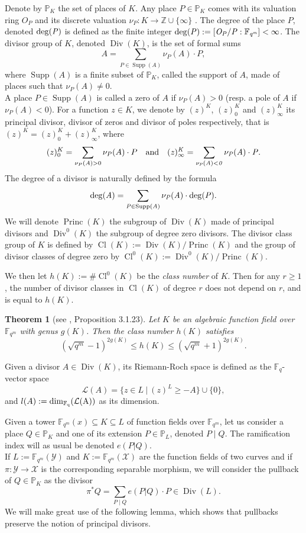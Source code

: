 \documentclass[10pt]{article}
\newtheorem{thm}{Theorem}
\newcommand{\s}{\vspace{0.3cm}}
\newcommand{\cd}{\cdot}
\newcommand{\Z}{\mathbb{Z}}
\newcommand{\PP}{\mathbb{P}}
\newcommand{\fqm}{\mathbb{F}_{q^m}}
\newcommand{\fq}{\mathbb{F}_q}
\newcommand{\su}{\subseteq}
\newcommand{\X}{\mathcal{X}}
\newcommand{\Y}{\mathcal{Y}}
\newcommand{\Div}{\operatorname{Div}}
\newcommand{\Princ}{\operatorname{Princ}}
\newcommand{\Cl}{\operatorname{Cl}}
\newcommand{\Supp}{\operatorname{Supp}}
\begin{document}
Denote by $\PP_K$ the set of places of $K$. Any place $P \in \PP_K$ comes with its valuation ring $O_P$ and its discrete valuation $\nu_P : K \rightarrow \Z \cup \{\infty\}$ . The degree of the place $P$, denoted $\rm{deg}(\it P)$ is defined as the finite integer $\rm{deg}( \it P) := \it [O_P/P:\fqm] < \infty$.
The divisor group of $K$, denoted $\Div(K)$, is the set of formal sums 
\[A = \sum\limits_{P \in \Supp(A)} \nu_P(A) \cd P,\]
where $\Supp(A)$ is a finite subset of $\PP_K$, called the support of $A$, made of places such that $\nu_{P}(A) \neq 0$. \\ A place  $P \in \Supp(A)$ is called a zero of $A$ if $\nu_P(A) >0$ (resp. a pole of $A$ if $\nu_P(A) < 0$). For a function $z \in K$, we denote by $(z)^K$, $(z)^K_0$ and $(z)^K_{\infty}$ its principal divisor, divisor of zeros and divisor of poles respectively, that is $(z)^K = (z)^K_0 + (z)^K_{\infty}$, where 
\[(z)^K_0 = \sum\limits_{\nu_P(A) > 0}\nu_P(A) \cd P \quad \rm{and} \it \quad (z)^K_{\infty} = \sum\limits_{\nu_P(A) < 0}\nu_P(A) \cd P.\]
The degree of a divisor is naturally defined by the formula
\[\rm{deg} (\it A) = \sum\limits_{P \in \Supp(A)} \nu_P(A) \cd \rm{deg}(\it P).\]
\s
We will denote $\Princ(K)$ the subgroup of $\Div(K)$ made of principal divisors and $\Div^0(K)$ the subgroup of degree zero divisors. The divisor class group of $K$ is defined by $\Cl(K):=\Div(K)/\Princ(K)$ and the group of divisor classes of degree zero by $\Cl^0(K):=\Div^0(K)/\Princ(K)$. 

We then let $h(K) := \# \Cl^0(K)$ be the \emph{class number} of $K$. Then for any $r \geq 1$, the number of divisor classes in $\Cl(K)$ of degree $r$ does not depend on $r$, and is equal to $h(K)$.

\s

\begin{thm}[see \cite{Tsf}, Proposition 3.1.23]\label{esti h(X)}
Let $K$ be an algebraic function field over $\fqm$ with genus $g(K)$. Then the class number $h(K)$ satisfies
\[ (\sqrt{q^m}-1)^{2g(K)} \leq h(K) \leq (\sqrt{q^m}+1)^{2g(K)}.\]
\end{thm}
\s

Given a divisor $A \in \Div(K)$, its Riemann-Roch space is defined as the $\fq$-vector space
\[\mathcal{L}(A) = \{z \in L \ | \ (z)^L \geq -A\} \cup \{0\},\]
and $l(A):= \rm{dim}_{\fq}(\mathcal{L}(A))$ as its dimension.

\s

Given a tower $\fqm(x) \su K \su L$ of function fields over $\fqm$, let us consider a place  $Q \in \PP_K$ and one of its extension $P \in \PP_L$, denoted $P\mid Q$. The ramification index will as usual be denoted $e(P|Q)$. \\
If $L := \fqm(\Y)$ and $K:=\fqm(\X)$ are the function fields of two curves and if $\pi : \Y \rightarrow \X$ is the corresponding separable morphism, we will consider the pullback of $Q \in \PP_K$ as the divisor
\[\pi^*Q = \sum\limits_{P \mid Q} e(P|Q) \cd P \in \Div(L).\]
We will make great use of the following lemma, which shows that pullbacks preserve the notion of principal divisors.
\end{document}
